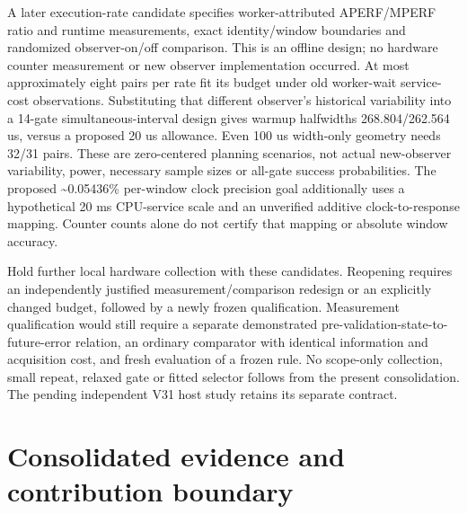 \documentclass[11pt,a4paper]{article}
\begin{document}
A later execution-rate candidate specifies worker-attributed APERF/MPERF ratio
and runtime measurements, exact identity/window boundaries and randomized
observer-on/off comparison. This is an offline design; no hardware counter
measurement or new observer implementation occurred. At most approximately eight
pairs per rate fit its budget under old worker-wait service-cost observations.
Substituting that different observer's historical variability into a 14-gate
simultaneous-interval design gives warmup halfwidths 268.804/262.564 us, versus
a proposed 20 us allowance. Even 100 us width-only geometry needs 32/31 pairs.
These are zero-centered planning scenarios, not actual new-observer variability,
power, necessary sample sizes or all-gate success probabilities. The proposed
\textasciitilde{}0.05436\% per-window clock precision goal additionally uses a hypothetical
20 ms CPU-service scale and an unverified additive clock-to-response mapping.
Counter counts alone do not certify that mapping or absolute window accuracy.

Hold further local hardware collection with these candidates. Reopening requires
an independently justified measurement/comparison redesign or an explicitly
changed budget, followed by a newly frozen qualification. Measurement qualification
would still require a separate demonstrated pre-validation-state-to-future-error
relation, an ordinary comparator with identical information and acquisition cost,
and fresh evaluation of a frozen rule. No scope-only collection, small repeat,
relaxed gate or fitted selector follows from the present consolidation. The
pending independent V31 host study retains its separate contract.

\section{Consolidated evidence and contribution boundary}
\end{document}
